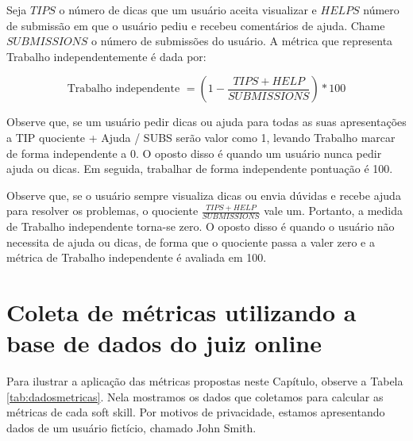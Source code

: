 Seja $TIPS$ o número de dicas que um usuário aceita visualizar e $HELPS$ número de submissão em que o usuário pediu e recebeu comentários de ajuda. Chame $SUBMISSIONS$ o número de submissões do usuário. A métrica que representa Trabalho independentemente é dada por:

\begin{equation} \label{m:independente}
\mbox{Trabalho independente } = \left(1 - \frac {TIPS + HELP}{SUBMISSIONS}\right) * 100
\end{equation}

Observe que, se um usuário pedir dicas ou ajuda para todas as suas apresentações a TIP quociente + Ajuda / SUBS serão valor como 1, levando Trabalho marcar de forma independente a 0. O oposto disso é quando um usuário nunca pedir ajuda ou dicas. Em seguida, trabalhar de forma independente pontuação é 100.

Observe que, se o usuário sempre visualiza dicas ou envia dúvidas e recebe ajuda para resolver os problemas, o quociente 
$\frac {TIPS + HELP}{SUBMISSIONS}$ vale um. Portanto, a medida de Trabalho independente torna-se zero.
O oposto disso é quando o usuário não necessita de ajuda ou dicas, de forma que o quociente passa a valer zero e a métrica de Trabalho independente é avaliada em 100.

\section{Coleta de métricas utilizando a base de dados do juiz online}

Para ilustrar a aplicação das métricas propostas neste Capítulo, observe a Tabela \ref{tab:dadosmetricas}. Nela mostramos os dados que coletamos para calcular as métricas de cada soft skill. Por motivos de privacidade, estamos apresentando dados de um usuário fictício, chamado John Smith.

